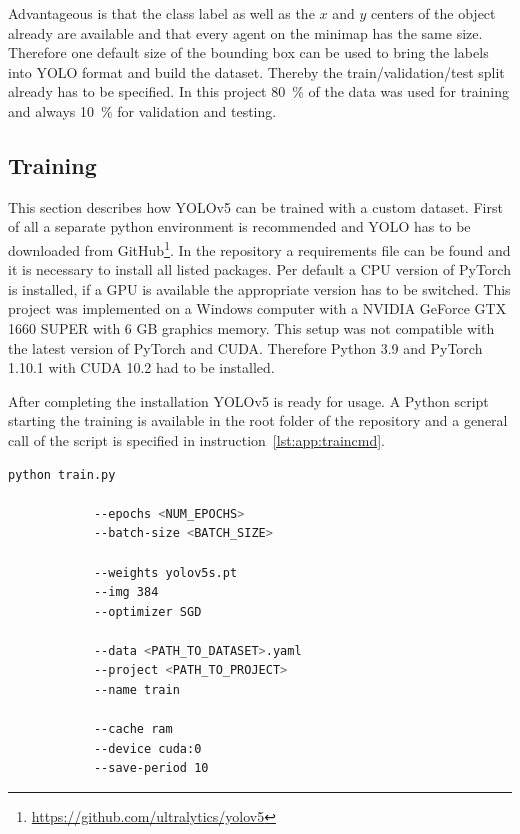 Advantageous is that the class label as well as the $x$ and $y$ centers of the object already are 
available and that every agent on the minimap has the same size. Therefore one default size of the 
bounding box can be used to bring the labels into YOLO format and build the dataset. Thereby the 
train/validation/test split already has to be specified. In this project 80~\% of the data was used for 
training and always 10~\% for validation and testing.

\subsection{Training}\label{subsec:app:training}

This section describes how YOLOv5 can be trained with a custom dataset. First of all a separate 
python environment is recommended and YOLO has to be downloaded from 
GitHub\footnote{\url{https://github.com/ultralytics/yolov5}}.  In the repository a requirements file can 
be found and it is necessary to install all listed packages. Per default a CPU version of PyTorch is 
installed, if a GPU is available the appropriate version has to be switched. This project was 
implemented on a Windows computer with a NVIDIA GeForce GTX 1660 SUPER with 6 GB graphics 
memory. This setup was not compatible with the latest version of PyTorch and CUDA. Therefore 
Python 3.9 and PyTorch 1.10.1 with CUDA 10.2 had to be installed.

After completing the installation YOLOv5 is ready for usage. A Python script starting the training is 
available in the root folder of the repository and a general call of the script is specified in 
instruction~\ref{lst:app:traincmd}. 

\renewcommand{\lstlistingname}{Instruction}
\begin{minipage}{\linewidth}
	\vspace*{0.5cm}
	\begin{lstlisting}[language=Bash, keywordstyle=\color{black}, 
		caption=General command to start the training of YOLOv5., label=lst:app:traincmd]
		python train.py
		
			--epochs <NUM_EPOCHS>
			--batch-size <BATCH_SIZE>
			
			--weights yolov5s.pt
			--img 384
			--optimizer SGD
			
			--data <PATH_TO_DATASET>.yaml
			--project <PATH_TO_PROJECT>
			--name train
			
			--cache ram
			--device cuda:0
			--save-period 10
	\end{lstlisting}
\end{minipage}

